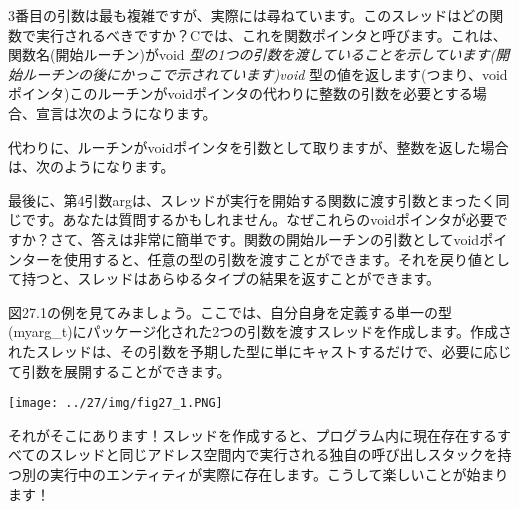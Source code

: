 3番目の引数は最も複雑ですが、実際には尋ねています。このスレッドはどの関数で実行されるべきですか？Cでは、これを関数ポインタと呼びます。これは、関数名(開始ルーチン)がvoid
\emph{型の1つの引数を渡していることを示しています(開始ルーチンの後にかっこで示されています)void
}型の値を返します(つまり、voidポインタ)このルーチンがvoidポインタの代わりに整数の引数を必要とする場合、宣言は次のようになります。

\begin{Shaded}
\begin{Highlighting}[]
                    \NormalTok{),}
\end{Highlighting}
\end{Shaded}

代わりに、ルーチンがvoidポインタを引数として取りますが、整数を返した場合は、次のようになります。

\begin{Shaded}
\begin{Highlighting}[]
\NormalTok{ *),}
\end{Highlighting}
\end{Shaded}

最後に、第4引数argは、スレッドが実行を開始する関数に渡す引数とまったく同じです。あなたは質問するかもしれません。なぜこれらのvoidポインタが必要ですか？さて、答えは非常に簡単です。関数の開始ルーチンの引数としてvoidポインターを使用すると、任意の型の引数を渡すことができます。それを戻り値として持つと、スレッドはあらゆるタイプの結果を返すことができます。

図27.1の例を見てみましょう。ここでは、自分自身を定義する単一の型(myarg\_t)にパッケージ化された2つの引数を渡すスレッドを作成します。作成されたスレッドは、その引数を予期した型に単にキャストするだけで、必要に応じて引数を展開することができます。

\texttt{[image: ../27/img/fig27\_1.PNG]}

それがそこにあります！スレッドを作成すると、プログラム内に現在存在するすべてのスレッドと同じアドレス空間内で実行される独自の呼び出しスタックを持つ別の実行中のエンティティが実際に存在します。こうして楽しいことが始まります！

